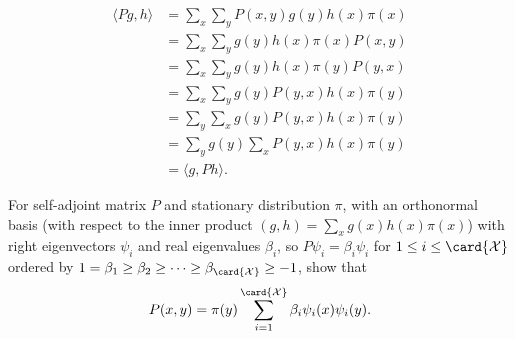 \documentclass[12pt]{article}
\begin{document}
\begin{solution}
    \begin{align*}
        \langle Pg, h \rangle &= \sum_x \sum_y P(x,y)g(y) h(x) \pi(x) \\
        &= \sum_x \sum_y g(y) h(x) \pi(x) P(x,y) \\
        &= \sum_x \sum_y g(y) h(x) \pi(y) P(y,x) \\
        &= \sum_x \sum_y g(y) P(y,x)h(x) \pi(y) \\
        &= \sum_y \sum_x g(y) P(y,x)h(x) \pi(y) \\
        &= \sum_y g(y) \sum_x P(y,x)h(x) \pi(y) \\
        &= \langle g, Ph \rangle.
    \end{align*}
\end{solution}
\begin{exercise}
    For self-adjoint matrix \( P \) and stationary distribution \( \pi \),
    with an orthonormal basis (with respect to the inner product \( (g,h)
    = \sum\limits_{x}g(x) h(x) \pi(x) \)) with right eigenvectors \(
    \psi_i \) and real eigenvalues \( \beta_i \), so \( P\psi_i = \beta_i
    \psi_i \) for \( 1 \le i \le \card{\mathcal{X}} \) ordered by \( 1 =
    \beta_1 \ge \beta_2 \ge \cdots \ge \beta_{\card{\mathcal{X}}} \ge -1
    \), show that
    \[
        P(x,y) = \pi(y) \sum\limits_{i=1}^{\card{\mathcal{X}}} \beta_i
        \psi_i(x) \psi_i(y).
    \]
\end{exercise}
\end{document}
